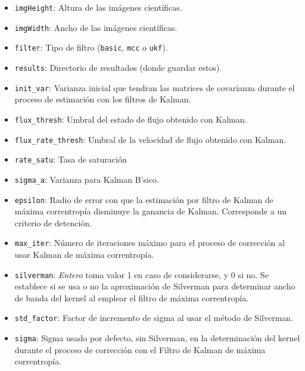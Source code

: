 \begin{itemize}
\item \texttt{imgHeight}: Altura de las im\'agenes cient\'ificas.
\item \texttt{imgWidth}: Ancho de las im\'agenes cient\'ificas.
\item \texttt{filter}: Tipo de filtro (\texttt{basic}, \texttt{mcc} o \texttt{ukf}).
\item \texttt{results}: Directorio de resultados (donde guardar estos).
\item \texttt{init\_var}: Varianza inicial que tendran las matrices de covarianza durante el proceso de estimaci\'on con los filtros de Kalman. 
\item \texttt{flux\_thresh}: Umbral del estado de flujo obtenido con Kalman. 
\item \texttt{flux\_rate\_thresh}: Umbral de la velocidad de flujo obtenido con Kalman.
\item \texttt{rate\_satu}: Tasa de saturaci\'on 
\item \texttt{sigma\_a}: Varianza para Kalman B\a'sico.
\item \texttt{epsilon}: Radio de error con que la estimaci\'on por filtro de Kalman de m\'axima correntrop\'ia disminuye la ganancia de Kalman. Corresponde a un criterio de detenci\'on.
\item \texttt{max\_iter}: N\'umero de iteraciones m\'aximo para el proceso de correcci\'on al usar Kalman de m\'axima correntrop\'ia. 
\item \texttt{silverman}: \textit{Entero} toma valor 1 en caso de considerarse, y 0 si no. Se establece si se usa o no la aproximaci\'on de Silverman para determinar ancho de banda del kernel al emplear el filtro de m\'axima correntrop\'ia.
\item \texttt{std\_factor}: Factor de incremento de sigma al usar el m\'etodo de Silverman.
\item \texttt{sigma}: Sigma usado por defecto, sin Silverman, en la determinaci\'on del kernel durante el proceso de correcci\'on con el Filtro de Kalman de m\'axima correntrop\'ia.
\end{itemize}


